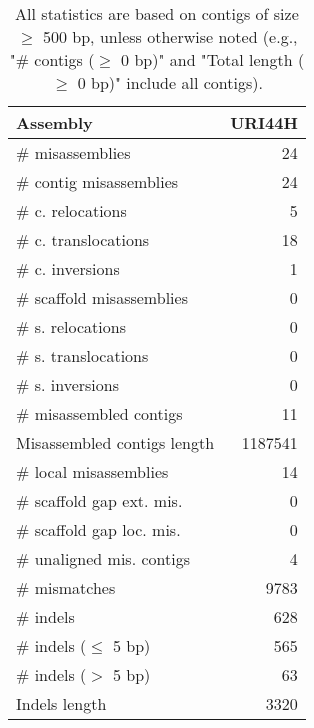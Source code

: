 \documentclass[12pt,a4paper]{article}
\begin{document}
\begin{table}[ht]
\begin{center}
\caption{All statistics are based on contigs of size $\geq$ 500 bp, unless otherwise noted (e.g., "\# contigs ($\geq$ 0 bp)" and "Total length ($\geq$ 0 bp)" include all contigs).}
\begin{tabular}{|l*{1}{|r}|}
\hline
Assembly & URI44H \\ \hline
\# misassemblies & 24 \\ \hline
\hspace{2mm}\# contig misassemblies & 24 \\ \hline
\hspace{5mm}\# c. relocations & 5 \\ \hline
\hspace{5mm}\# c. translocations & 18 \\ \hline
\hspace{5mm}\# c. inversions & 1 \\ \hline
\hspace{2mm}\# scaffold misassemblies & 0 \\ \hline
\hspace{5mm}\# s. relocations & 0 \\ \hline
\hspace{5mm}\# s. translocations & 0 \\ \hline
\hspace{5mm}\# s. inversions & 0 \\ \hline
\# misassembled contigs & 11 \\ \hline
Misassembled contigs length & 1187541 \\ \hline
\# local misassemblies & 14 \\ \hline
\# scaffold gap ext. mis. & 0 \\ \hline
\# scaffold gap loc. mis. & 0 \\ \hline
\# unaligned mis. contigs & 4 \\ \hline
\# mismatches & 9783 \\ \hline
\# indels & 628 \\ \hline
\hspace{5mm}\# indels ($\leq$ 5 bp) & 565 \\ \hline
\hspace{5mm}\# indels ($>$ 5 bp) & 63 \\ \hline
Indels length & 3320 \\ \hline
\end{tabular}
\end{center}
\end{table}
\end{document}
